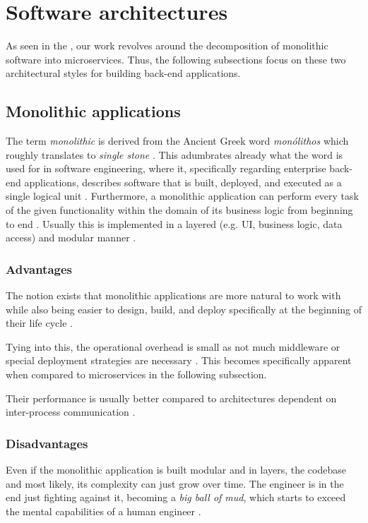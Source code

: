 \documentclass[12pt,a4paper]{report}
\begin{document}
\section{Software architectures} \label{sect:background-architecture}

As seen in the \textit{}, our work revolves around
the decomposition of monolithic software into microservices. Thus, the
following subsections focus on these two architectural styles for building
back\hyp end applications.


\subsection{Monolithic applications}

The term \textit{monolithic} is derived from the Ancient Greek word \textit{
monólithos} which roughly translates to \textit{single stone}
\cite{press2011oxford}. This adumbrates already what the word is used for in software
engineering, where it, specifically regarding enterprise back-end applications,
describes software that is built, deployed, and executed as a single logical
unit \cite{ms-fowler}. Furthermore, a monolithic application can perform every
task of the given functionality within the domain of its business logic from
beginning to end \cite{monolith}. Usually this is implemented in a layered
(e.g. UI, business logic, data access) and modular manner \cite{ms-fowler, monolith}.


\subsubsection{Advantages}
The notion exists that monolithic
applications are more natural to work with while also being easier to design,
build, and deploy specifically at the beginning of their life cycle
\cite{ms-fowler, raymond2003unix}.

Tying into this, the operational overhead is small as not much middleware or
special deployment strategies are necessary \cite{ms-fowler}. This becomes
specifically apparent when compared to microservices in the following
subsection.

Their performance is usually better compared to architectures dependent
on inter-process communication \cite{knoche2016sustaining}.


\subsubsection{Disadvantages}
Even if the monolithic application is built
modular and in layers, the codebase and most likely, its complexity can just
grow over time. The engineer is in the end just fighting against it, becoming a
\textit{big ball of mud}, which starts to exceed the mental capabilities of a
human engineer \cite{newman2015building, foote1997bigballofmud, france2007model}.
\end{document}
